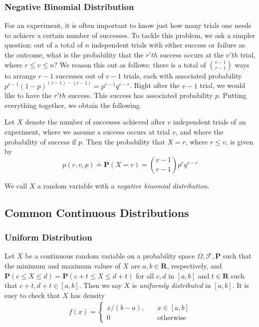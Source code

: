 \subsubsection{Negative Binomial Distribution}
For an experiment, it is often important to know just how many trials
one needs to achieve a certain number of successes. To tackle this problem,
we ask a simpler question: out of a total of $n$ independent trials with
either success or failure as the outcome, what is the probability
that the $r'th$ success occurs at the $v'th$ trial, where $r \le v \le n$?
We reason this out as follows: there is a total of $\binom{v-1}{r-1}$ ways to
arrange $r-1$ successes out of $v-1$ trials, each with associated probability
$p^{r-1}{(1 - p)}^{(v-1) - (r-1)} = p^{r-1}q^{v-r}$. Right after the $v-1$ 
trial, we would like to
have the $r'th$ success. This success has associated probability $p$. Putting
everything together, we obtain the following.
\begin{theorem}
	Let $X$ denote the number of successes achieved after $v$ independent 
	trials of an experiment,
	where we assume a success occurs at trial $v$, and where the probability
	of success if $p$. Then the probability that $X=r$, where $r \le v$, is 
	given by
	\begin{equation*}
		p(r, v, p) \doteq \mathbf{P}(X = r) = \binom{v-1}{r-1} p^{r} q^{v-r}
	\end{equation*}
	\begin{definition}
		We call $X$ a random variable with a \emph{negative binomial 
		distribution}.
	\end{definition}
\end{theorem}
\subsection{Common Continuous Distributions}
\subsubsection{Uniform Distribution}
\begin{definition}
	Let $X$ be a continuous random variable on a probability space $\Omega, 
	\mathcal{F},
	\mathbf{P}$ such that the minimum and maximum values of $X$ are $a,b \in \mathbf{R}$,
	respectively, and $\mathbf{P}(c \le X \le d ) = \mathbf{P}(c + t \le X \le d + t)$
	for all $c, d$ in $[a,b]$  and $t \in \mathbf{R}$ such that $c+t, d+t \in [a,b]$.
	Then we say $X$ is \emph{uniformly distributed} in $[a,b]$. It is easy to 
	check
	that $X$ has density  
	\begin{align*}
		f(x) = \begin{cases}
			x/(b-a), \quad & x \in [a,b] \\
			0 \quad &\text{otherwise}
		\end{cases}
	\end{align*}
\end{definition}
